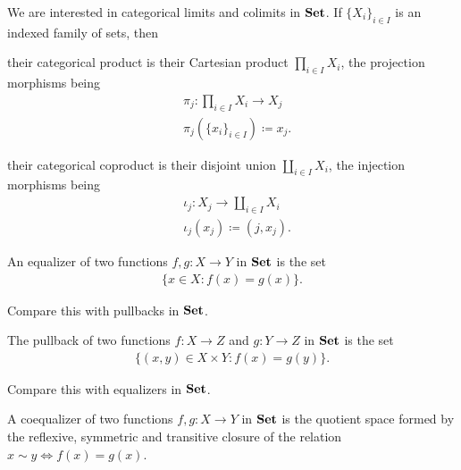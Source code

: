 \begin{theorem}\label{thm:set_categorical_limits}
  We are interested in categorical limits and colimits in $\operatorname{\mathbf{Set}}$. If $\{ X_i \}_{i \in I}$ is an indexed family of sets, then
  \begin{defenum}
    \item\label{thm:set_categorical_limits/product} their categorical product is their Cartesian product $\prod_{i \in I} X_i$, the projection morphisms being
    \begin{align*}
      &\pi_j: \prod_{i \in I} X_i \to X_j \\
      &\pi_j(\{ x_i \}_{i \in I}) \coloneqq x_j.
    \end{align*}

    \item\label{thm:set_categorical_limits/coproduct} their categorical coproduct is their disjoint union $\coprod_{i \in I} X_i$, the injection morphisms being
    \begin{align*}
      &\iota_j: X_j \to \coprod_{i \in I} X_i \\
      &\iota_j(x_j) \coloneqq (j, x_j).
    \end{align*}

    \item\label{thm:set_categorical_limits/equalizer} An equalizer of two functions $f, g: X \to Y$ in $\operatorname{\mathbf{Set}}$ is the set
    \begin{align*}
      \{ x \in X \colon f(x) = g(x) \}.
    \end{align*}

    Compare this with pullbacks in $\operatorname{\mathbf{Set}}$.

    \item\label{thm:set_categorical_limits/pullback} The pullback of two functions $f: X \to Z$ and $g: Y \to Z$ in $\operatorname{\mathbf{Set}}$ is the set
    \begin{align*}
      \{ (x, y) \in X \times Y \colon f(x) = g(y) \}.
    \end{align*}

    Compare this with equalizers in $\operatorname{\mathbf{Set}}$.

    \item\label{thm:set_categorical_limits/coequalizer} A coequalizer of two functions $f, g: X \to Y$ in $\operatorname{\mathbf{Set}}$ is the quotient space formed by the reflexive, symmetric and transitive closure of the relation $x \sim y \iff f(x) = g(x)$.


\end{defenum}
\end{theorem}
